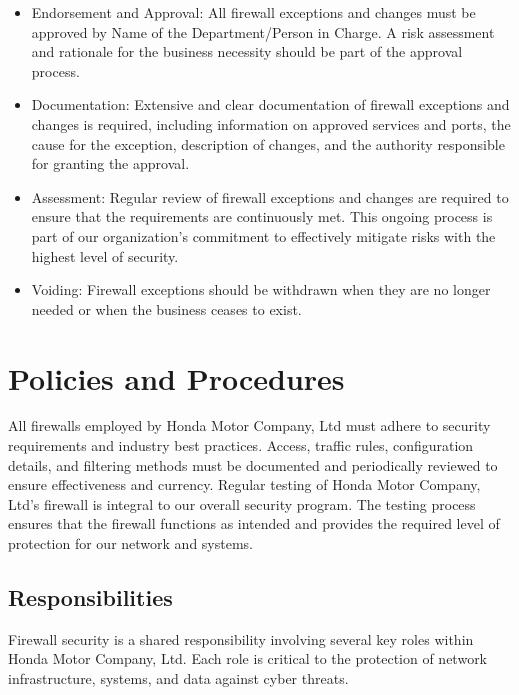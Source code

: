 \begin{itemize}
    \item Endorsement and Approval: All firewall exceptions and changes must be approved by {Name of the Department/Person in Charge}. A risk assessment and rationale for the business necessity should be part of the approval process.
    
    \item Documentation: Extensive and clear documentation of firewall exceptions and changes is required, including information on approved services and ports, the cause for the exception, description of changes, and the authority responsible for granting the approval.
    
    \item Assessment: Regular review of firewall exceptions and changes are required to ensure that the requirements are continuously met. This ongoing process is part of our organization’s commitment to effectively mitigate risks with the highest level of security.
    
    \item Voiding: Firewall exceptions should be withdrawn when they are no longer needed or when the business ceases to exist.
\end{itemize}







\section{Policies and Procedures}
All firewalls employed by Honda Motor Company, Ltd must adhere to security requirements and industry best practices. Access, traffic rules, configuration details, and filtering methods must be documented and periodically reviewed to ensure effectiveness and currency. Regular testing of Honda Motor Company, Ltd's firewall is integral to our overall security program. The testing process ensures that the firewall functions as intended and provides the required level of protection for our network and systems. 

    \subsection{Responsibilities}
    Firewall security is a shared responsibility involving several key roles within Honda Motor Company, Ltd. Each role is critical to the protection of network infrastructure, systems, and data against cyber threats.
    
